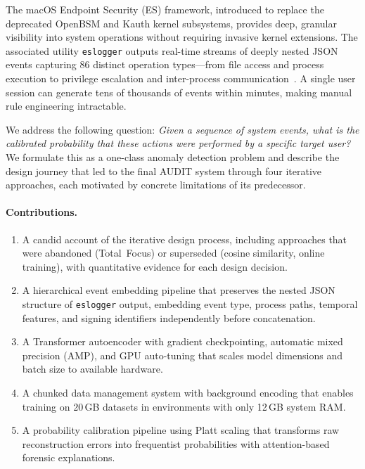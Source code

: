\documentclass[letterpaper,twocolumn,10pt]{article}
\begin{document}
The macOS Endpoint Security (ES) framework, introduced to replace
the deprecated OpenBSM and Kauth kernel subsystems, provides deep,
granular visibility into system operations without requiring
invasive kernel extensions.  The associated utility
\texttt{eslogger} outputs real-time streams of deeply nested JSON
events capturing 86 distinct operation types---from file access
and process execution to privilege escalation and inter-process
communication~\cite{apple_es}.  A single user session can generate
tens of thousands of events within minutes, making manual rule
engineering intractable.

We address the following question: \emph{Given a sequence of system
events, what is the calibrated probability that these actions were
performed by a specific target user?}  We formulate this as a
one-class anomaly detection problem and describe the design journey
that led to the final AUDIT system through four iterative
approaches, each motivated by concrete limitations of its
predecessor.

\paragraph{Contributions.}
\begin{enumerate}[nosep,leftmargin=*]
\item A candid account of the iterative design process, including
  approaches that were abandoned (Total~Focus) or superseded
  (cosine similarity, online training), with quantitative evidence
  for each design decision.
\item A hierarchical event embedding pipeline that preserves the
  nested JSON structure of \texttt{eslogger} output, embedding
  event type, process paths, temporal features, and signing
  identifiers independently before concatenation.
\item A Transformer autoencoder with gradient checkpointing,
  automatic mixed precision (AMP), and GPU auto-tuning that scales
  model dimensions and batch size to available hardware.
\item A chunked data management system with background encoding
  that enables training on 20\,GB datasets in environments with
  only 12\,GB system RAM.
\item A probability calibration pipeline using Platt scaling that
  transforms raw reconstruction errors into frequentist
  probabilities with attention-based forensic explanations.
\end{enumerate}
\end{document}
